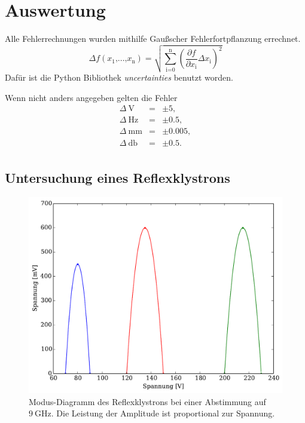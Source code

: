\section{Auswertung} %
\label{sec:auswertung}

Alle Fehlerrechnungen wurden mithilfe Gaußscher Fehlerfortpflanzung errechnet.
\begin{equation}
	\Delta f(x_\text{1}\text{,...,}x_\text{n}) = \sqrt{\sum_\text{i=0}^\text{n} \left(\frac{\partial f}{\partial x_\text{i}} \Delta x_\text{i}\right)^2}
\end{equation}
Dafür ist die Python Bibliothek \textit{uncertainties} benutzt worden.

Wenn nicht anders angegeben gelten die Fehler
\begin{eqnarray}
	\Delta \SI{}{\volt} &=& \pm 5 ,\\
	\Delta \SI{}{\hertz} &=& \pm 0.5 ,\\
	\Delta \SI{}{\milli\meter} &=& \pm 0.005 ,\\
	\Delta \SI{}{\decibel} &=& \pm 0.5 .\\
\end{eqnarray}

\subsection{Untersuchung eines Reflexklystrons} %
\label{sub:untersuchung_der_}

\begin{figure}
	\includegraphics[width = 14cm]{pic/ModenDiagramm.pdf}
	\caption[]{Modus-Diagramm des Reflexklystrons bei einer Abstimmung auf $\SI{9}{\giga\hertz}$. Die Leistung der Amplitude ist proportional zur Spannung.}
	\label{mode}
\end{figure}

